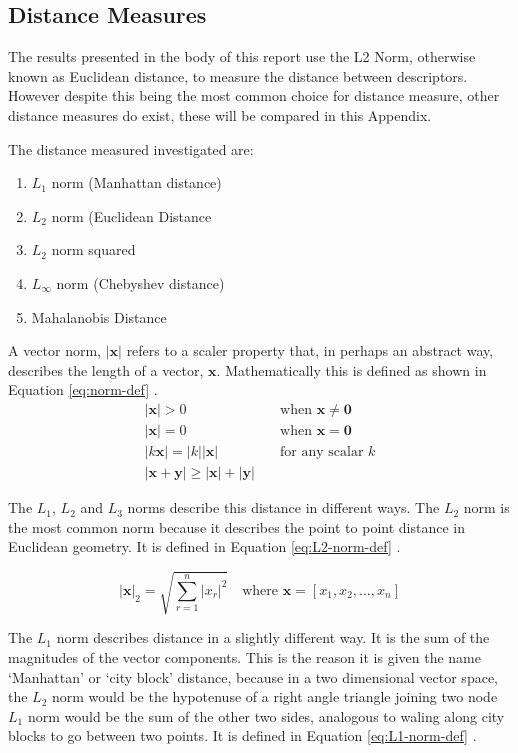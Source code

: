 \begin{appendices}
\chapter{Distance Measures} \label{app:dist-measures}

The results presented in the body of this report use the L2 Norm, otherwise known as Euclidean distance, to measure the distance between descriptors. However despite this being the most common choice for distance measure, other distance measures do exist, these will be compared in this Appendix.

The distance measured investigated are:
\begin{enumerate}
	\item $L_1$ norm (Manhattan distance)
	\item $L_2$ norm (Euclidean Distance
	\item $L_2$ norm squared
	\item $L_\infty $ norm (Chebyshev distance)
	\item Mahalanobis Distance
\end{enumerate}

A vector norm, $|\mathbf{x}|$ refers to a scaler property that, in perhaps an abstract way, describes the length of a vector, $\mathbf{x}$. Mathematically this is defined as shown in Equation \ref{eq:norm-def} \cite[p. 1081]{gradshteyn2007}.
\begin{align}
|\mathbf{x}| > 0 \quad &\text{when } \mathbf{x} \neq \mathbf{0} \nonumber \\
|\mathbf{x}| = 0 \quad &\text{when } \mathbf{x} = \mathbf{0} \nonumber \\
|k\mathbf{x}| = |k||\mathbf{x}| \quad &\text{for any scalar } k \nonumber \\
|\mathbf{x}+\mathbf{y}| \geq |\mathbf{x}|+|\mathbf{y}| \quad & \label{eq:norm-def}
\end{align}

The $L_1$, $L_2$ and $L_3$ norms describe this distance in different ways. The $L_2$ norm is the most common norm because it describes the point to point distance in Euclidean geometry. It is defined in Equation \ref{eq:L2-norm-def} \cite[p. 1081]{gradshteyn2007}.

\begin{equation}
|\mathbf{x}|_2 = \sqrt{\sum_{r=1}^{n} |x_r|^2} \quad \text{where } \mathbf{x} = [ x_1 , x_2, ... , x_n] \label{eq:L2-norm-def}
\end{equation}

The $L_1$ norm describes distance in a slightly different way. It is the sum of the magnitudes of the vector components. This is the reason it is given the name `Manhattan' or `city block' distance, because in a two dimensional vector space, the $L_2$ norm would be the hypotenuse of a right angle triangle joining two node $L_1$ norm would be the sum of the other two sides, analogous to waling along city blocks to go between two points. It is defined in Equation \ref{eq:L1-norm-def} \cite[p. 1081]{gradshteyn2007}.


\end{appendices}
